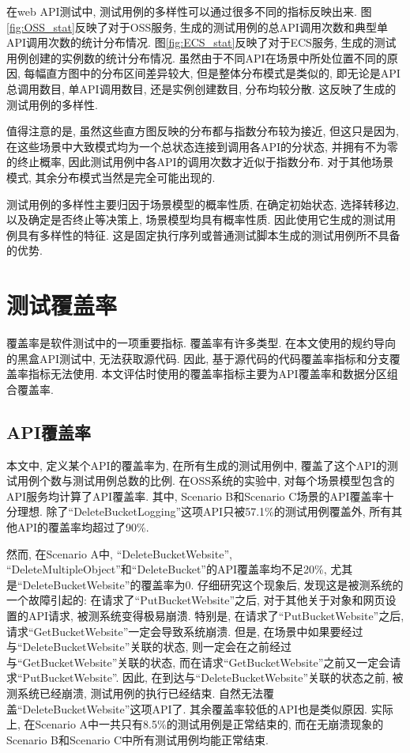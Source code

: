         在web API测试中, 测试用例的多样性可以通过很多不同的指标反映出来. 图\ref{fig:OSS_stat}反映了对于OSS服务, 生成的测试用例的总API调用次数和典型单API调用次数的统计分布情况. 图\ref{fig:ECS_stat}反映了对于ECS服务, 生成的测试用例创建的实例数的统计分布情况. 虽然由于不同API在场景中所处位置不同的原因, 每幅直方图中的分布区间差异较大, 但是整体分布模式是类似的, 即无论是API总调用数目, 单API调用数目, 还是实例创建数目, 分布均较分散. 这反映了生成的测试用例的多样性.
        
        值得注意的是, 虽然这些直方图反映的分布都与指数分布较为接近, 但这只是因为, 在这些场景中大致模式均为一个总状态连接到调用各API的分状态, 并拥有不为零的终止概率, 因此测试用例中各API的调用次数才近似于指数分布. 对于其他场景模式, 其余分布模式当然是完全可能出现的.
        
        测试用例的多样性主要归因于场景模型的概率性质, 在确定初始状态, 选择转移边, 以及确定是否终止等决策上, 场景模型均具有概率性质. 因此使用它生成的测试用例具有多样性的特征. 这是固定执行序列或普通测试脚本生成的测试用例所不具备的优势.

    \section{测试覆盖率}
        覆盖率是软件测试中的一项重要指标. 覆盖率有许多类型. 在本文使用的规约导向的黑盒API测试中, 无法获取源代码. 因此, 基于源代码的代码覆盖率指标和分支覆盖率指标无法使用. 本文评估时使用的覆盖率指标主要为API覆盖率和数据分区组合覆盖率.
        
        \subsection{API覆盖率}
        
            本文中, 定义某个API的覆盖率为, 在所有生成的测试用例中, 覆盖了这个API的测试用例个数与测试用例总数的比例. 在OSS系统的实验中, 对每个场景模型包含的API服务均计算了API覆盖率. 其中, Scenario B和Scenario C场景的API覆盖率十分理想. 除了“DeleteBucketLogging”这项API只被57.1\%的测试用例覆盖外, 所有其他API的覆盖率均超过了90\%.
            
            然而, 在Scenario A中, “DeleteBucketWebsite”, “DeleteMultipleObject”和“DeleteBucket”的API覆盖率均不足20\%, 尤其是“DeleteBucketWebsite”的覆盖率为0. 仔细研究这个现象后, 发现这是被测系统的一个故障引起的: 在请求了“PutBucketWebsite”之后, 对于其他关于对象和网页设置的API请求, 被测系统变得极易崩溃. 特别是, 在请求了“PutBucketWebsite”之后, 请求“GetBucketWebsite”一定会导致系统崩溃. 但是, 在场景中如果要经过与“DeleteBucketWebsite”关联的状态, 则一定会在之前经过与“GetBucketWebsite”关联的状态, 而在请求“GetBucketWebsite”之前又一定会请求“PutBucketWebsite”. 因此, 在到达与“DeleteBucketWebsite”关联的状态之前, 被测系统已经崩溃, 测试用例的执行已经结束. 自然无法覆盖“DeleteBucketWebsite”这项API了. 其余覆盖率较低的API也是类似原因. 实际上, 在Scenario A中一共只有8.5\%的测试用例是正常结束的, 而在无崩溃现象的Scenario B和Scenario C中所有测试用例均能正常结束.
            
